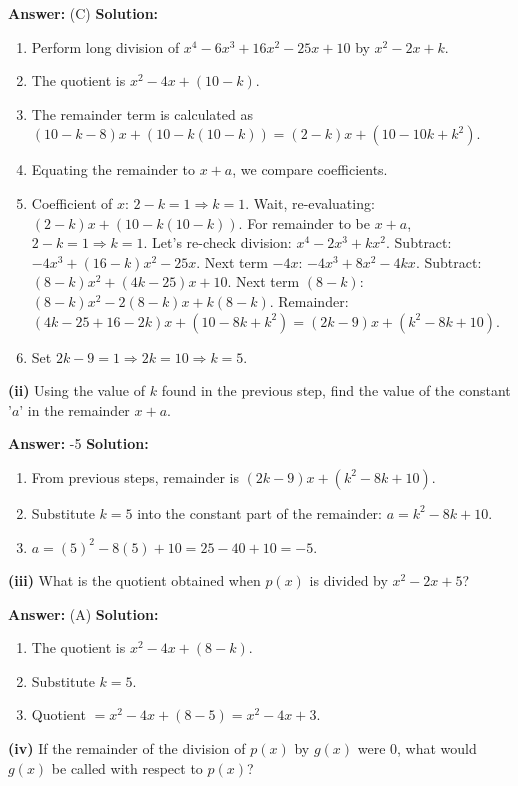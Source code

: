 \documentclass[12pt,a4paper]{exam}
\begin{document}
\begin{questions}
\textbf{Answer:} (C)
\textbf{Solution:}
\begin{enumerate}
  \item Perform long division of $x^4 - 6x^3 + 16x^2 - 25x + 10$ by $x^2 - 2x + k$.
  \item The quotient is $x^2 - 4x + (10 - k)$.
  \item The remainder term is calculated as $(10 - k - 8)x + (10 - k(10 - k)) = (2 - k)x + (10 - 10k + k^2)$.
  \item Equating the remainder to $x + a$, we compare coefficients.
  \item Coefficient of $x$: $2 - k = 1 \Rightarrow k = 1$. Wait, re-evaluating: $(2-k)x + (10-k(10-k))$. For remainder to be $x+a$, $2-k=1 \Rightarrow k=1$. Let's re-check division: $x^4-2x^3+kx^2$. Subtract: $-4x^3+(16-k)x^2-25x$. Next term $-4x$: $-4x^3+8x^2-4kx$. Subtract: $(8-k)x^2+(4k-25)x+10$. Next term $(8-k)$: $(8-k)x^2 - 2(8-k)x + k(8-k)$. Remainder: $(4k-25+16-2k)x + (10-8k+k^2) = (2k-9)x + (k^2-8k+10)$.
  \item Set $2k-9 = 1 \Rightarrow 2k=10 \Rightarrow k=5$.
\end{enumerate}

\textbf{(ii)} Using the value of $k$ found in the previous step, find the value of the constant '$a$' in the remainder $x + a$.

\textbf{Answer:} -5
\textbf{Solution:}
\begin{enumerate}
  \item From previous steps, remainder is $(2k-9)x + (k^2-8k+10)$.
  \item Substitute $k=5$ into the constant part of the remainder: $a = k^2 - 8k + 10$.
  \item $a = (5)^2 - 8(5) + 10 = 25 - 40 + 10 = -5$.
\end{enumerate}

\textbf{(iii)} What is the quotient obtained when $p(x)$ is divided by $x^2 - 2x + 5$?

\textbf{Answer:} (A)
\textbf{Solution:}
\begin{enumerate}
  \item The quotient is $x^2 - 4x + (8-k)$.
  \item Substitute $k=5$.
  \item Quotient $= x^2 - 4x + (8-5) = x^2 - 4x + 3$.
\end{enumerate}

\textbf{(iv)} If the remainder of the division of $p(x)$ by $g(x)$ were $0$, what would $g(x)$ be called with respect to $p(x)$?


\end{questions}
\end{document}
